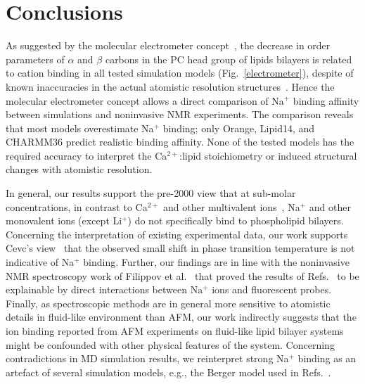 \documentclass[twoside,twocolumn,9pt]{article}
\begin{document}
\section{Conclusions}
As suggested by the molecular electrometer concept~\cite{brown77,akutsu81,altenbach84,seelig87,scherer89},
the decrease in order parameters of $\alpha$ and $\beta$ carbons in the PC head group of lipids bilayers
is related to cation binding  in all tested simulation models (Fig.~\ref{electrometer}), despite of known inaccuracies 
in the actual atomistic resolution structures~\cite{botan15}. Hence the molecular electrometer concept allows a direct comparison
of Na$^+$ binding affinity between simulations and noninvasive NMR experiments.
The comparison reveals that most models overestimate Na$^+$ binding; only Orange, Lipid14, and CHARMM36 
predict realistic binding affinity. None of the tested models has the required accuracy to interpret
the Ca$^{2+}$:lipid stoichiometry or induced structural changes with atomistic resolution.

In general, our results support the pre-2000 view that at sub-molar concentrations, in contrast to Ca$^{2+}$ and other multivalent ions~\cite{eisenberg79,akutsu81,altenbach84,tatulian87,cevc90,tocanne90,clarke99,binder02,pabst07,filippov09},
Na$^+$ and other monovalent ions (except Li$^+$) do not specifically bind to phospholipid bilayers.
Concerning the interpretation of existing experimental data, our work supports Cevc's view~\cite{cevc90}
that the observed small shift in phase transition temperature is not indicative of Na$^+$ binding.
Further, our findings are in line with the noninvasive NMR spectroscopy work of Filippov et al.~\cite{filippov09} 
that proved the results of Refs.~ to be explainable by direct interactions between Na$^+$ ions and fluorescent probes.
Finally, as spectroscopic methods are in general more sensitive to atomistic details in fluid-like environment than AFM, our work indirectly suggests that the ion 
binding reported from AFM experiments on fluid-like lipid bilayer systems~\cite{manyes05,manyes06,fukuma07,ferber11,morata12} might be confounded with other physical features of the system.
Concerning contradictions in MD simulation results, we reinterpret strong Na$^+$ binding as an artefact of several simulation models, e.g., the Berger model used in Refs.~.
\end{document}
